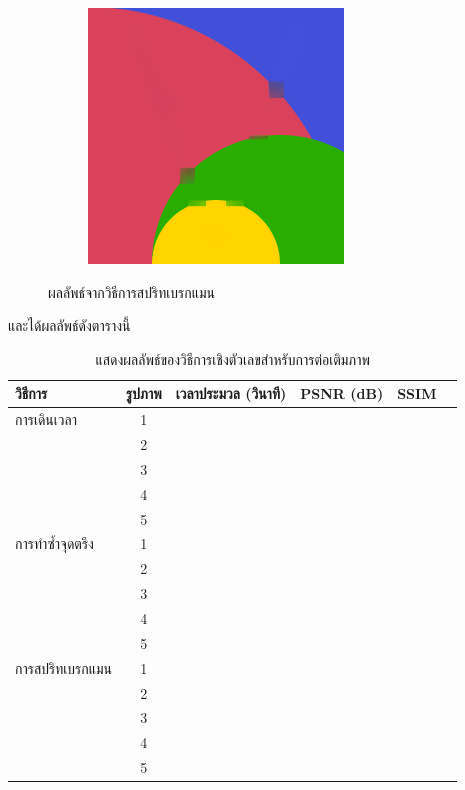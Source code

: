 \documentclass[hidelinks, a4paper,12pt]{article}
\numberwithin{equation}{section}							%
\numberwithin{equation}{section}
\begin{document}
{\begin{figure}[H]
\begin{subfigure}{0.4\linewidth}
		\includegraphics[width=0.8\linewidth]{images/result_ex1/splitbergman05.png}			
	\end{subfigure}
	\caption{ผลลัพธ์จากวิธีการสปริทเบรกแมน}
\end{figure}
และได้ผลลัพธ์ดังตารางนี้ 
\begin{table}[H]
	\centering
		\begin{tabular}[ht]{|l|c|c|c|c|c|}
			\hline
			วิธีการ  & รูปภาพ &เวลาประมวล  (วินาที) & PSNR (dB) & SSIM \\
			\hline
			การเดินเวลา & 1 &  &  & \\ 
			& 2 &  &  & \\
			& 3 &  &  & \\
			& 4 &  &  & \\
			& 5 &  &  & \\
			\hline
			การทำซ้ำจุดตรึง & 1 &  & & \\
			& 2 &  & & \\
			& 3 &  & & \\
			& 4 &  & & \\
			& 5 &  & & \\
			\hline
			การสปริทเบรกแมน  & 1 &  & & \\
			& 2 &  & & \\
			& 3 &  & & \\
			& 4 &  & & \\
			& 5 &  & & \\
			\hline
		\end{tabular}
		\caption{แสดงผลลัพธ์ของวิธีการเชิงตัวเลขสำหรับการต่อเติมภาพ}
	\end{table}	
}
\end{document}
